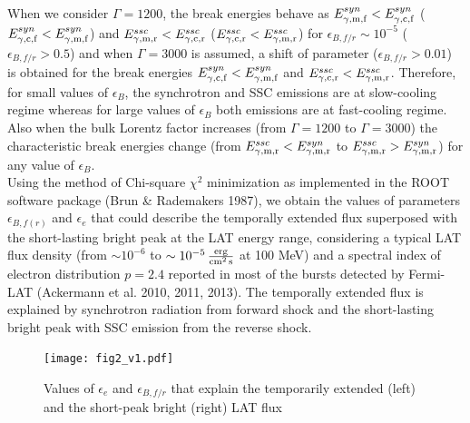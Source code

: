 \documentclass[11pt,twoside]{article}
\begin{document}
%
%
When we consider $\Gamma=1200$,  the break energies behave as $E^{syn}_{\rm \gamma,m,f} <  E^{syn}_{\rm \gamma,c,f}$ ($E^{syn}_{\rm \gamma,c,f}  < E^{syn}_{\rm \gamma,m,f}$) and  $E^{ssc}_{\rm \gamma,m,r} <  E^{ssc}_{\rm \gamma,c,r}$ ($E^{ssc}_{\rm \gamma,c,r} < E^{ssc}_{\rm \gamma,m,r}$) for  $\epsilon_{B,f/r}\sim 10^{-5}$ ($\epsilon_{B,f/r}> 0.5$) and  when $\Gamma=3000$ is assumed, a shift of parameter ($\epsilon_{B,f/r}> 0.01$) is obtained for the break energies  $E^{syn}_{\rm \gamma,c,f}  < E^{syn}_{\rm \gamma,m,f}$ and $E^{ssc}_{\rm \gamma,c,r} < E^{ssc}_{\rm \gamma,m,r}$. Therefore, for small values of $\epsilon_B$, the synchrotron and SSC emissions are at slow-cooling regime whereas for large values of $\epsilon_B$ both emissions are at fast-cooling regime. Also when the bulk Lorentz factor increases (from $\Gamma=1200$ to  $\Gamma=3000$) the characteristic break energies change (from $E^{ssc}_{\rm \gamma,m,r}<E^{syn}_{\rm \gamma,m,r}$ to $E^{ssc}_{\rm \gamma,m,r}>E^{syn}_{\rm \gamma,m,r}$) for any value of $\epsilon_B$.\\
%
Using the method of Chi-square $\chi^2$ minimization as implemented in the ROOT software package (Brun \& Rademakers 1987), we obtain the values of parameters $\epsilon_{B,f(r)}$ and $\epsilon_{e}$ that could describe the temporally extended flux superposed with the short-lasting bright peak at the LAT energy range, considering a typical LAT flux density (from $\sim 10^{-6}$  to  $\sim10^{-5}\, {\rm \frac{erg}{cm^2\,s}}$ at 100 MeV) and a spectral index of electron distribution $p=2.4$ reported in most of the bursts detected by Fermi-LAT (Ackermann et al. 2010, 2011, 2013). The temporally extended flux is explained by synchrotron radiation from forward shock and the short-lasting bright peak with SSC emission from the reverse shock.\\ 
%
\begin{figure} %
\texttt{[image: fig2\_v1.pdf]}
\caption{Values of $\epsilon_e$ and $\epsilon_{B,f/r}$ that explain the temporarily extended (left)  and the short-peak bright (right)  LAT  flux}
\label{fig2}
\end{figure}
\end{document}
